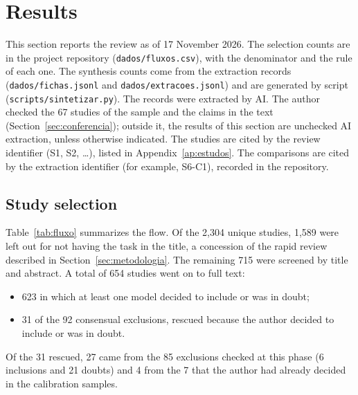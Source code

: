 \section{Results}\label{sec:resultados}
This section reports the review as of 17 November 2026. The selection counts are in the project repository
(\texttt{dados/fluxos.csv}), with the denominator and the rule of each one. The synthesis counts come from the extraction
records (\texttt{dados/fichas.jsonl} and \texttt{dados/extracoes.jsonl}) and are generated by script
(\texttt{scripts/sintetizar.py}). The records were extracted by AI. The author checked the 67 studies of the sample and the
claims in the text (Section~\ref{sec:conferencia}); outside it, the results of this section are unchecked AI
extraction, unless otherwise indicated. The studies are cited by the review identifier (S1, S2, \ldots), listed in
Appendix~\ref{ap:estudos}. The comparisons are cited by the extraction identifier (for example, S6-C1), recorded
in the repository.

\subsection{Study selection}
Table~\ref{tab:fluxo} summarizes the flow. Of the 2,304 unique studies, 1,589 were left out for not having the task in the
title, a concession of the rapid review described in Section~\ref{sec:metodologia}. The remaining 715 were screened by
title and abstract. A total of 654 studies went on to full text:
\begin{itemize}
  \item 623 in which at least one model decided to include or was in doubt;
  \item 31 of the 92 consensual exclusions, rescued because the author decided to include or was in doubt.
\end{itemize}
Of the 31 rescued, 27 came from the 85 exclusions checked at this phase (6 inclusions and 21 doubts) and 4 from the 7 that the
author had already decided in the calibration samples.

